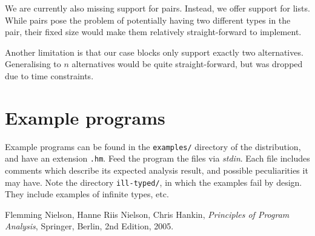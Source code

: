\documentclass[a4paper]{article}
\begin{document}
We are currently also missing support for pairs. Instead, we offer support for
 lists. While pairs pose the problem of potentially having two different types in
the pair, their fixed size would make them relatively straight-forward to implement.

Another limitation is that our case blocks only support exactly two alternatives.
Generalising to $n$ alternatives would be quite straight-forward, but was dropped
due to time constraints.


\section{Example programs}

Example programs can be found in the \texttt{examples/} directory of the distribution, 
and have an extension \texttt{.hm}. Feed the program the files via \emph{stdin}. Each file
includes comments which describe its expected analysis result, and possible peculiarities
it may have. Note the directory \texttt{ill-typed/}, in which the examples fail by design.
They include examples of infinite types, etc. 


\begin{thebibliography}{9}

  {Flemming Nielson, Hanne Riis Nielson, Chris Hankin},
  \emph{Principles of Program Analysis},
  Springer, Berlin,
  2nd Edition,
  2005.

\end{thebibliography}
\end{document}
